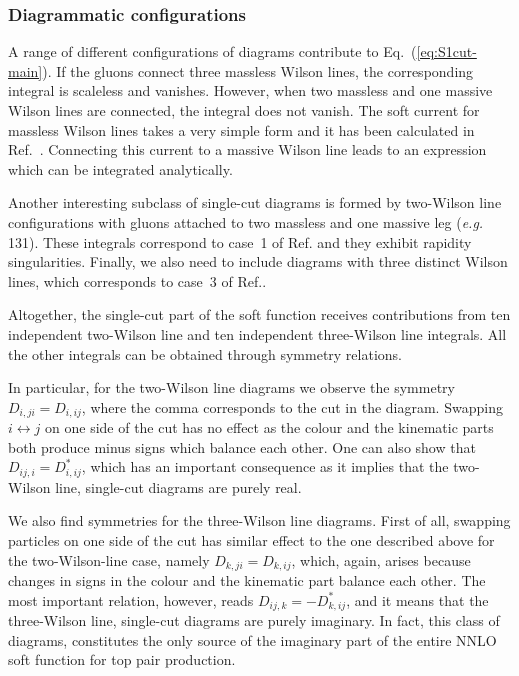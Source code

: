 \documentclass[a4paper,11pt]{article}
\newcommand{\eg}{{\it e.g. }}
\numberwithin{equation}{section}
\begin{document}
\subsubsection{Diagrammatic configurations}

A range of different configurations of diagrams contribute to
Eq.~(\ref{eq:S1cut-main}).  If the gluons connect three massless Wilson lines,
the corresponding integral is scaleless and vanishes. However, when two
massless and one massive Wilson
lines are connected, the integral does not vanish. 
%
The soft current for massless Wilson lines takes a very simple form and it has
been calculated in Ref.~\cite{Catani:2000pi}. Connecting this current to a
massive Wilson line leads to an expression which can be integrated analytically.

Another interesting subclass of single-cut diagrams is formed by two-Wilson line
configurations with gluons attached to two massless and one massive leg (\eg
131). These integrals correspond to case~1 of Ref.\cite{Bierenbaum:2011gg} and
they exhibit rapidity singularities. Finally, we also need to include diagrams
with three distinct Wilson lines, which corresponds to case~3 of
Ref.\cite{Bierenbaum:2011gg}.

Altogether, the single-cut part of the soft function receives contributions
from ten independent two-Wilson line and ten independent three-Wilson line
integrals. All the other integrals can be obtained through symmetry relations.
 
In particular, for the two-Wilson line diagrams we observe the symmetry
$D_{i,ji}=D_{i,ij}$, where the comma corresponds to the cut in the diagram.
Swapping $i \leftrightarrow j$ on one side of the cut has no effect as the
colour and the kinematic parts both produce minus signs which balance each
other.  One can also show that $D_{ij,i} = D_{i,{ij}}^*$, which has an important
consequence as it implies that the two-Wilson line, single-cut diagrams are
purely real.

We also find symmetries for the three-Wilson line diagrams. First of all, swapping
particles on one side of the cut has similar effect to the one described above
for the two-Wilson-line case,
namely $D_{k,ji} = D_{k,ij}$, which, again, arises because changes in signs in
the colour and the kinematic part balance each other. 
%
The most important relation, however, reads $D_{ij,k} = -D_{k,ij}^*$, and it
means that the three-Wilson line, single-cut diagrams are purely imaginary. In
fact, this class of diagrams, constitutes the only source of the imaginary part
of the entire NNLO soft function for top pair production.
\end{document}
